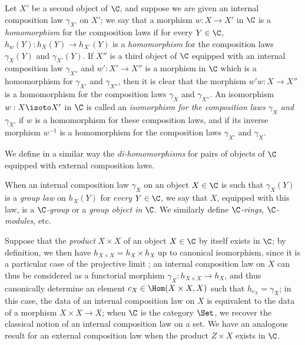 \begin{env}[8.2.2]
\label{0.8.2.2}
Let $X'$ be a second object of $\C$, and suppose we are given an internal composition law $\gamma_{X'}$ on $X'$; we say that a morphism $w:X\to X'$ in $\C$ is a \emph{homomorphism} for the composition laws if for every $Y\in\C$, $h_w(Y):h_X(Y)\to h_{X'}(Y)$ is a \emph{homomorphism} for the composition laws $\gamma_X(Y)$ and $\gamma_{X'}(Y)$.
If $X''$ is a third
object of $\C$ equipped with an internal composition law $\gamma_{X''}$ and $w':X'\to X''$ is a morphism in $\C$ which is a homomorphism for $\gamma_{X'}$ and $\gamma_{X''}$, then it is clear that the morphism $w'w:X\to X''$ is a homomorphism for the composition laws $\gamma_X$ and $\gamma_{X''}$.
An isomorphism $w:X\isoto X'$ in $\C$ is called an \emph{isomorphism for the composition laws $\gamma_X$ and $\gamma_{X'}$} if $w$ is a homomorphism for these composition laws, and if its inverse morphism $w^{-1}$ is a homomorphism for the composition laws $\gamma_{X'}$ and $\gamma_X$.

We define in a similar way the \emph{di-homomorphisms} for pairs of objects of $\C$ equipped with external composition laws.
\end{env}

\begin{env}[8.2.3]
\label{0.8.2.3}
When an internal composition law $\gamma_X$ on an object $X\in\C$ is such that $\gamma_X(Y)$ is a \emph{group law} on $h_X(Y)$ for \emph{every} $Y\in\C$, we say that $X$, equipped with this law, is a \emph{$\C$-group} or a \emph{group object in $\C$}.
We similarly define \emph{$\C$-rings}, \emph{$\C$-modules}, etc.
\end{env}

\begin{env}[8.2.4]
\label{0.8.2.4}
Suppose that the \emph{product} $X\times X$ of an object $X\in\C$ by itself exists in $\C$; by definition, we then have $h_{X\times X}=h_X\times h_X$ up to canonical isomorphism, since it is a particular case of the projective limit ; an internal composition law on $X$ can thus be considered as a functorial morphism $\gamma_X:h_{X\times X}\to h_X$, and thus canonically determine  an element $c_X\in\Hom(X\times X,X)$ such that $h_{c_X}=\gamma_X$; in this case, the data of an internal composition law on $X$ is equivalent to the data of a morphism $X\times X\to X$; when $\C$ is the category $\Set$, we recover the classical notion of an internal composition law on a set.
We have an analogous result for an external composition law when the product $Z\times X$ exists in $\C$.
\end{env}

